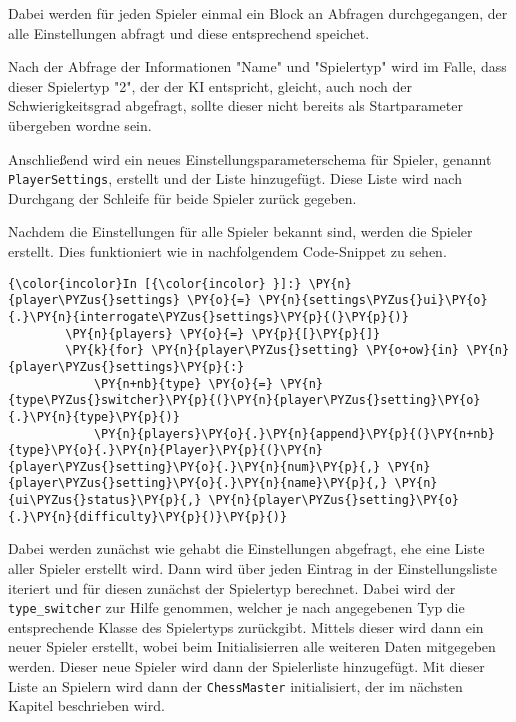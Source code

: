     Dabei werden für jeden Spieler einmal ein Block an Abfragen
durchgegangen, der alle Einstellungen abfragt und diese entsprechend
speichet.

Nach der Abfrage der Informationen "Name" und "Spielertyp" wird im
Falle, dass dieser Spielertyp "2", der der KI entspricht, gleicht, auch
noch der Schwierigkeitsgrad abgefragt, sollte dieser nicht bereits als
Startparameter übergeben wordne sein.

Anschließend wird ein neues Einstellungsparameterschema für Spieler,
genannt \texttt{PlayerSettings}, erstellt und der Liste hinzugefügt.
Diese Liste wird nach Durchgang der Schleife für beide Spieler zurück
gegeben.

Nachdem die Einstellungen für alle Spieler bekannt sind, werden die
Spieler erstellt. Dies funktioniert wie in nachfolgendem Code-Snippet zu
sehen.

    \begin{Verbatim}[commandchars=\\\{\}]
{\color{incolor}In [{\color{incolor} }]:} \PY{n}{player\PYZus{}settings} \PY{o}{=} \PY{n}{settings\PYZus{}ui}\PY{o}{.}\PY{n}{interrogate\PYZus{}settings}\PY{p}{(}\PY{p}{)}
        \PY{n}{players} \PY{o}{=} \PY{p}{[}\PY{p}{]}
        \PY{k}{for} \PY{n}{player\PYZus{}setting} \PY{o+ow}{in} \PY{n}{player\PYZus{}settings}\PY{p}{:}
            \PY{n+nb}{type} \PY{o}{=} \PY{n}{type\PYZus{}switcher}\PY{p}{(}\PY{n}{player\PYZus{}setting}\PY{o}{.}\PY{n}{type}\PY{p}{)}
            \PY{n}{players}\PY{o}{.}\PY{n}{append}\PY{p}{(}\PY{n+nb}{type}\PY{o}{.}\PY{n}{Player}\PY{p}{(}\PY{n}{player\PYZus{}setting}\PY{o}{.}\PY{n}{num}\PY{p}{,} \PY{n}{player\PYZus{}setting}\PY{o}{.}\PY{n}{name}\PY{p}{,} \PY{n}{ui\PYZus{}status}\PY{p}{,} \PY{n}{player\PYZus{}setting}\PY{o}{.}\PY{n}{difficulty}\PY{p}{)}\PY{p}{)}
\end{Verbatim}

    Dabei werden zunächst wie gehabt die Einstellungen abgefragt, ehe eine
Liste aller Spieler erstellt wird. Dann wird über jeden Eintrag in der
Einstellungsliste iteriert und für diesen zunächst der Spielertyp
berechnet. Dabei wird der \texttt{type\_switcher} zur Hilfe genommen,
welcher je nach angegebenen Typ die entsprechende Klasse des Spielertyps
zurückgibt. Mittels dieser wird dann ein neuer Spieler erstellt, wobei
beim Initialisierren alle weiteren Daten mitgegeben werden. Dieser neue
Spieler wird dann der Spielerliste hinzugefügt. Mit dieser Liste an
Spielern wird dann der \texttt{ChessMaster} initialisiert, der im
nächsten Kapitel beschrieben wird.


